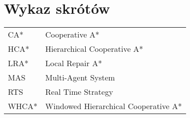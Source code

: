 \chapter*{Wykaz skrótów}

\begin{tabular}{l l}
CA* & Cooperative A* \\
HCA* & Hierarchical Cooperative A* \\
LRA* & Local Repair A* \\
MAS & Multi-Agent System \\
RTS & Real Time Strategy \\
WHCA* & Windowed Hierarchical Cooperative A* \\

\end{tabular}
